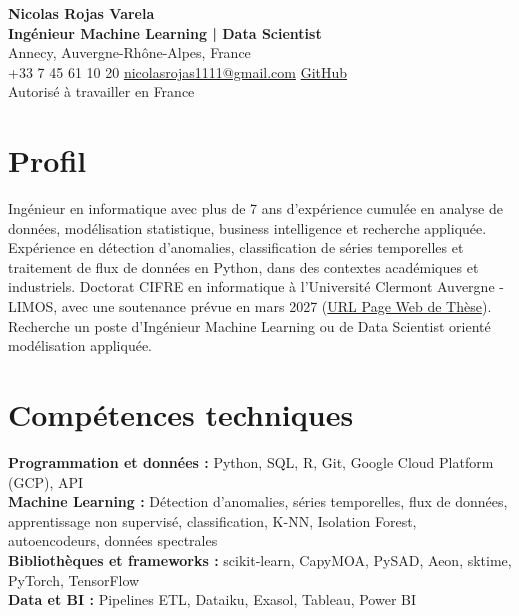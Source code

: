 \documentclass[12pt,a4paper]{article}
\begin{document}
{\centering
{\LARGE\textbf{Nicolas Rojas Varela}}\\[0.5mm]
{\large\textbf{Ingénieur Machine Learning | Data Scientist}}\\[0.5mm]
Annecy, Auvergne-Rhône-Alpes, France\\
+33 7 45 61 10 20 \textbar{} \href{mailto:nicolasrojas1111@gmail.com}{nicolasrojas1111@gmail.com} \textbar{} \href{https://github.com/nirojasva}{GitHub}\\
Autorisé à travailler en France\par}
\vspace{1pt}

\section*{Profil}
Ingénieur en informatique avec plus de 7 ans d'expérience cumulée en analyse de données, modélisation statistique, business intelligence et recherche appliquée. Expérience en détection d'anomalies, classification de séries temporelles et traitement de flux de données en Python, dans des contextes académiques et industriels. Doctorat CIFRE en informatique à l'Université Clermont Auvergne - LIMOS, avec une soutenance prévue en mars 2027 (\href{https://spectral-anomaly-detector.limos.fr/index_en.html}{URL Page Web de Thèse}). Recherche un poste d'Ingénieur Machine Learning ou de Data Scientist orienté modélisation appliquée.

\section*{Compétences techniques}
\textbf{Programmation et données :} Python, SQL, R, Git, Google Cloud Platform (GCP), API\\
\textbf{Machine Learning :} Détection d'anomalies, séries temporelles, flux de données, apprentissage non supervisé, classification, K-NN, Isolation Forest, autoencodeurs, données spectrales\\
\textbf{Bibliothèques et frameworks :} scikit-learn, CapyMOA, PySAD, Aeon, sktime, PyTorch, TensorFlow\\
\textbf{Data et BI :} Pipelines ETL, Dataiku, Exasol, Tableau, Power BI
\end{document}

